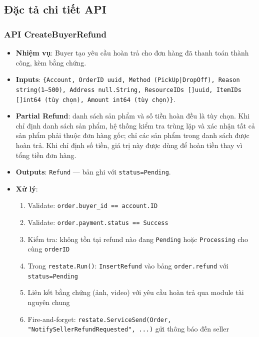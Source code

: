 \subsection{Đặc tả chi tiết API}
\label{subsec:refund-api-detail}

\subsubsection{API CreateBuyerRefund}
\label{subsubsec:api-create-buyer-refund}

\begin{itemize}[leftmargin=*]
  \item \textbf{Nhiệm vụ}: Buyer tạo yêu cầu hoàn trả cho đơn hàng đã thanh toán thành công, kèm bằng chứng.
  \item \textbf{Inputs}: \texttt{\{Account, OrderID uuid, Method (PickUp|DropOff), Reason string(1--500), Address null.String, ResourceIDs []uuid, ItemIDs []int64 (tùy chọn), Amount int64 (tùy chọn)\}}.
  \item \textbf{Partial Refund}: danh sách sản phẩm và số tiền hoàn đều là tùy chọn. Khi chỉ định danh sách sản phẩm, hệ thống kiểm tra trùng lặp và xác nhận tất cả sản phẩm phải thuộc đơn hàng gốc; chỉ các sản phẩm trong danh sách được hoàn trả. Khi chỉ định số tiền, giá trị này được dùng để hoàn tiền thay vì tổng tiền đơn hàng.
  \item \textbf{Outputs}: \texttt{Refund} — bản ghi với \texttt{status=Pending}.
  \item \textbf{Xử lý}:
    \begin{enumerate}
      \item Validate: \texttt{order.buyer\_id == account.ID}
      \item Validate: \texttt{order.payment.status == Success}
      \item Kiểm tra: không tồn tại refund nào đang \texttt{Pending} hoặc \texttt{Processing} cho cùng \texttt{orderID}
      \item Trong \texttt{restate.Run()}: \texttt{InsertRefund} vào bảng \texttt{order.refund} với \texttt{status=Pending}
      \item Liên kết bằng chứng (ảnh, video) với yêu cầu hoàn trả qua module tài nguyên chung
      \item Fire-and-forget: \texttt{restate.ServiceSend(Order, "NotifySellerRefundRequested", ...)} gửi thông báo đến seller
    \end{enumerate}
\end{itemize}

